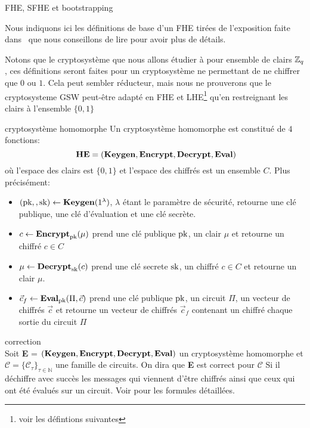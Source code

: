 \begin{section}{FHE, SFHE et bootstrapping}

Nous indiquons ici les définitions de base d'un FHE tirées de 
l'exposition faite dans~\cite{halevi} que nous conseillons 
de lire pour avoir plus de détails.

Notons que le cryptosystème que nous allons étudier à pour ensemble de clairs $\mathbb{Z}_q$, ces
définitions seront faites pour un cryptosystème ne permettant de ne chiffrer que $0$ ou $1$.
Cela peut sembler réducteur, mais nous ne prouverons que le  cryptosysteme
GSW peut-être adapté en FHE et LHE\footnote{voir les défintions suivantes} qu'en restreignant 
les clairs à l'ensemble $\{0, 1\}$

\begin{definition}{cryptosystème homomorphe}
Un cryptosystème homomorphe est constitué de $4$ fonctions:
\[ \text{\textbf{HE}} = (\Keygen, \Enc, \Dec, \Eval)\]
où l'espace des clairs est $\{0,1\}$ et l'espace des chiffrés est un ensemble $C$.
Plus précisément:
\begin{itemize}
\item $(\text{pk},, \text{sk}) \leftarrow \text{\textbf{Keygen}}(1^\lambda)$, $\lambda$ étant le paramètre de sécurité, retourne une clé publique, une clé d'évaluation et une clé secrète.
\item $c \leftarrow \text{\textbf{Encrypt}}_{\text{pk}}(\mu)$ prend une clé publique $\text{pk}$, un clair $\mu$ et retourne un chiffré $c\in C$
\item $\mu \leftarrow \text{\textbf{Decrypt}}_{\text{sk}}(c)$ prend une clé secrete $\text{sk}$, un chiffré $c \in C$ et retourne un clair $\mu$.
\item $\vec{c}_f \leftarrow \text{\textbf{Eval}}_{\text{pk}}(\Pi,\vec{c})$ prend une clé publique
$\text{pk}$, un circuit  $\Pi$, un vecteur de chiffrés $\vec{c}$ et retourne un
vecteur de chiffrés $\vec{c}_f$ contenant un chiffré chaque sortie du circuit $\Pi$
\end{itemize}
\end{definition}

\begin{definition}{correction} \\
Soit \textbf{E} = $(\text{\textbf{Keygen}}, \text{\textbf{Encrypt}}, \text{\textbf{Decrypt}}, \text{\textbf{Eval}})$ un cryptosystème homomorphe
et  $\mathcal{C} = \{ \mathcal{C}_\tau\}_{\tau \in \mathbb{N}}$ une famille de
circuits.  On dira que \textbf{E} est correct pour $\mathcal{C}$
Si il déchiffre avec succès les messages qui viennent d'être chiffrés 
ainsi que ceux qui ont été évalués sur un circuit. Voir \cite{halevi} pour les
formules détaillées.
\end{definition}


\end{section}
